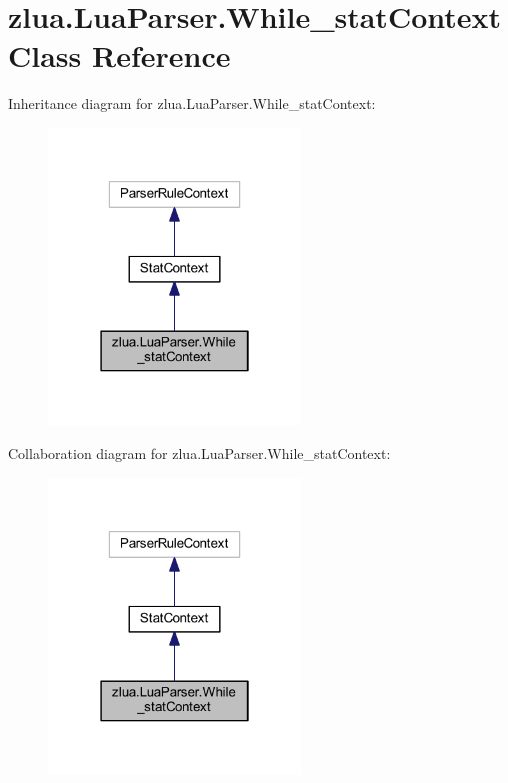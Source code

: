 \hypertarget{classzlua_1_1_lua_parser_1_1_while__stat_context}{}\section{zlua.\+Lua\+Parser.\+While\+\_\+stat\+Context Class Reference}
\label{classzlua_1_1_lua_parser_1_1_while__stat_context}


Inheritance diagram for zlua.\+Lua\+Parser.\+While\+\_\+stat\+Context\+:
\nopagebreak
\begin{figure}[H]
\begin{center}
\leavevmode
\includegraphics[width=190pt]{classzlua_1_1_lua_parser_1_1_while__stat_context__inherit__graph}
\end{center}
\end{figure}


Collaboration diagram for zlua.\+Lua\+Parser.\+While\+\_\+stat\+Context\+:
\nopagebreak
\begin{figure}[H]
\begin{center}
\leavevmode
\includegraphics[width=190pt]{classzlua_1_1_lua_parser_1_1_while__stat_context__coll__graph}
\end{center}
\end{figure}

